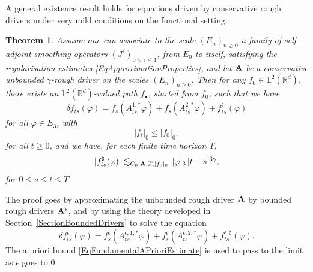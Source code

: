 \documentclass[11pt,a4paper]{amsart}
\newcommand{\RR}{\mathbb{R}}  \newcommand{\CC}{\mathbb{C}}  \newcommand{\LL}{\mathbb{L}}  \newcommand{\WW}{\mathbb{W}}
\renewcommand{\leq}{\leqslant}
\renewcommand{\geq}{\geqslant}
\theoremstyle{plain}%
\newtheorem{theorem}{Theorem}
\theoremstyle{definition}
\theoremstyle{remark}
\numberwithin{equation}{section} %
\begin{document}
\smallskip

A general existence result holds for equations driven by conservative rough drivers under very mild conditions on the functional setting.

\begin{theorem}
\label{ThmRDEHilbertGeneral}
Assume one can associate to the scale $(E_n)_{n\geq 0}$ a family of \emph{self-adjoint} smoothing operators $(J^\epsilon)_{0<\epsilon\leq 1}$, from $E_0$ to itself, satisfying the regularisation estimates \eqref{EqApproximationProperties}, and let $\bf A$ be a conservative unbounded $\gamma$-rough driver on the scales $(E_n)_{n\geq 0}$. Then for any $f_0\in\LL^2(\RR^d)$, there exists an $\LL^2(\RR^d)$-valued path $f_\bullet$, started from $f_0$, such that we have
\begin{equation*}
\delta f_{ts}(\varphi) = f_s(A^{1,*}_{ts}\varphi) + f_s(A^{2,*}_{ts}\varphi) + f^\natural_{ts}(\varphi)
\end{equation*}
for all $\varphi\in E_3$, with 
\begin{equation*}
| f_t|_0\leq | f_0|_0,
\end{equation*}
for all $ t\geq 0$, and we have, for each finite time horizon $T$,
\begin{equation}
\label{EqBoundRemainderX}
| f^\natural_{ts}(\varphi) | \lesssim_{C_0,{\bf A}, T,| f_0|_0}\,|\varphi|_3\,|t-s|^{3\gamma},
\end{equation}
for $0\leq s\leq t\leq T$.
\end{theorem}

\noindent The proof goes by approximating the unbounded rough driver $\bf A$ by bounded rough drivers  ${\bf A}^\epsilon$, and by using the theory developed in Section~\ref{SectionBoundedDrivers} to solve the equation
\begin{equation}
\label{EqApproximatedRDE}
\delta f^\epsilon_{ts}(\varphi) = f^\epsilon_s (A^{\epsilon,1,*}_{ts}\varphi) + f^\epsilon_s( A^{\epsilon,2,*}_{ts} \varphi) + f^{\epsilon,\natural}_{ts}(\varphi).
\end{equation}
The a priori bound \eqref{EqFundamentalAPrioriEstimate} is used to pass to the limit as  $\epsilon$ goes to $0$.

\medskip
\end{document}
